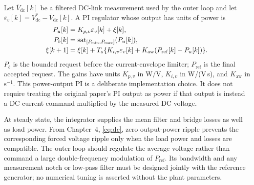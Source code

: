 Let $\overline V_{\mathrm{dc}}[k]$ be a filtered DC-link measurement used by the outer loop and let $\varepsilon_v[k]=V_{\mathrm{dc}}^\ast-\overline V_{\mathrm{dc}}[k]$. A PI regulator whose output has units of power is
\begin{align}
P_u[k]&=K_{p,v}\varepsilon_v[k]+\xi[k],\notag\\
P_b[k]&=\operatorname{sat}_{[P_{\min},P_{\max}]}(P_u[k]),\notag\\
\xi[k+1]&=\xi[k]+T_s\{K_{i,v}\varepsilon_v[k]+K_{\mathrm{aw}}(P_{\mathrm{ref}}[k]-P_u[k])\}.
\label{eq:ch5-pi}
\end{align}
$P_b$ is the bounded request before the current-envelope limiter; $P_{\mathrm{ref}}$ is the final accepted request. The gains have units $K_{p,v}$ in W/V, $K_{i,v}$ in W/(V\,s), and $K_{\mathrm{aw}}$ in $\mathrm{s}^{-1}$. This power-output PI is a deliberate implementation choice. It does not require treating the original paper's PI output as power if that output is instead a DC current command multiplied by the measured DC voltage.

At steady state, the integrator supplies the mean filter and bridge losses as well as load power. From Chapter~4, \eqref{eq:dc}, zero output-power ripple prevents the corresponding forced voltage ripple only when the load power and losses are compatible. The outer loop should regulate the average voltage rather than command a large double-frequency modulation of $P_{\mathrm{ref}}$. Its bandwidth and any measurement notch or low-pass filter must be designed jointly with the reference generator; no numerical tuning is asserted without the plant parameters.

